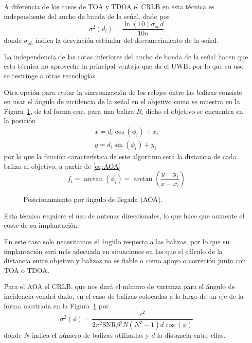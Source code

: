 A diferencia de los casos de TOA y TDOA el CRLB en esta técnica es independiente del ancho de banda de la señal, dado por \cite{MAIN}
\begin{equation}\label{eq:CRLB_RSSI}
    \sigma^2(d_i) = \frac{\ln(10)\sigma_{sh}d}{10n}
\end{equation}
donde $\sigma_{sh}$ indica la desviación estándar del desvanecimiento de la señal.

La independencia de las cotas inferiores del ancho de banda de la señal hacen que esta técnica no aproveche la principal ventaja que da el UWB, por lo que su uso se restringe a otras tecnologías.


Otra opción para evitar la sincronización de los relojes entre las balizas consiste en usar el ángulo de incidencia de la señal en el objetivo como se muestra en la Figura~\ref{fig:AOA}, de tal forma que, para una baliza $B_i$ dicho el objetivo se encuentra en la posición
\begin{equation}
    \label{eq:AOA}
    \begin{aligned}
        x = d_i \cos(\phi_i) + x_i \\        
        y = d_i \sin(\phi_i) + y_i         
    \end{aligned}
\end{equation}
por lo que la función característica de este algoritmo será la distancia de cada baliza al objetivo, a partir de \eqref{eq:AOA}
\begin{equation}
    f_i = \arctan(\phi_i) = \arctan(\frac{y-y_i}{x-x_i})
\end{equation}

\begin{figure}[H]
    \centering
    \def\svgwidth{0.6\linewidth}
	
    \caption{Posicionamiento por ángulo de llegada (AOA).}
    \label{fig:AOA}
\end{figure}
Esta técnica requiere el uso de antenas direccionales, lo que hace que aumente el coste de su implantación.

En este caso solo necesitamos el ángulo respecto a las balizas, por lo que su implantación será más adecuada en situaciones en las que el cálculo de la distancia entre objetivo y balizas no es fiable o como apoyo o correción junto con TOA o TDOA.

Para el AOA el CRLB, que nos dará el mínimo de varianza para el ángulo de incidencia vendrá dado, en el caso de balizas colocadas a lo largo de un eje de la forma mostrada en la Figura~\ref{fig:AOA} por \cite{Xbook, shim2018}
\begin{equation}
    \sigma^2(\phi) = \frac{c^2}{2\pi^2 \text{SNR} \beta^2 N(N^2-1)d\cos(\phi)}
\end{equation}
donde $N$ indica el número de balizas utilizadas y $d$ la distancia entre ellas.

